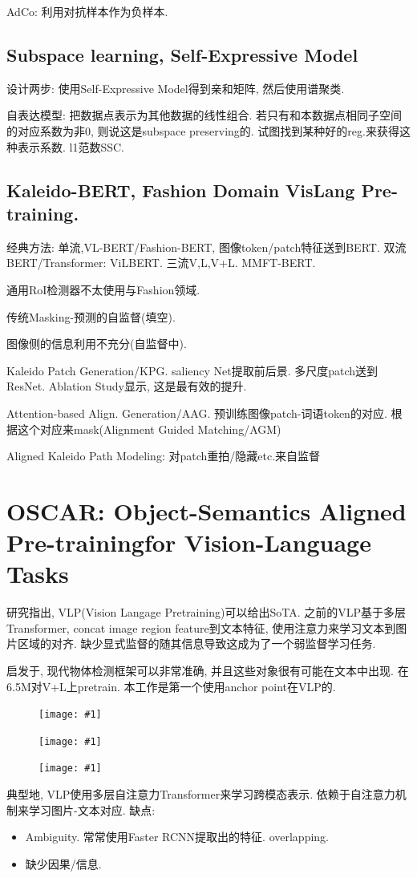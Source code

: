 \documentclass{article}
\newcommand{\cfig}[1]{
    \begin{figure}[htbp]
    \centering
    \texttt{[image: \#1]}
\end{figure}
}
\begin{document}
AdCo: 利用对抗样本作为负样本.

\subsection{Subspace learning, Self-Expressive Model}
设计两步: 使用Self-Expressive Model得到亲和矩阵, 然后使用谱聚类.

自表达模型: 把数据点表示为其他数据的线性组合.
若只有和本数据点相同子空间的对应系数为非0, 则说这是subspace preserving的.
试图找到某种好的reg.来获得这种表示系数. l1范数SSC.

\subsection{Kaleido-BERT, Fashion Domain VisLang Pre-training.} 

经典方法: 单流,VL-BERT/Fashion-BERT, 图像token/patch特征送到BERT.
双流BERT/Transformer: ViLBERT.
三流V,L,V+L. MMFT-BERT.

通用RoI检测器不太使用与Fashion领域.

传统Masking-预测的自监督(填空).

图像侧的信息利用不充分(自监督中).

Kaleido Patch Generation/KPG. saliency Net提取前后景. 多尺度patch送到ResNet. Ablation Study显示, 这是最有效的提升.

Attention-based Align. Generation/AAG. 预训练图像patch-词语token的对应. 根据这个对应来mask(Alignment Guided Matching/AGM)

Aligned Kaleido Path Modeling: 对patch重拍/隐藏etc.来自监督


\section{OSCAR: Object-Semantics Aligned Pre-trainingfor Vision-Language Tasks}

研究指出, VLP(Vision Langage Pretraining)可以给出SoTA. 之前的VLP基于多层Transformer, concat image region feature到文本特征, 使用注意力来学习文本到图片区域的对齐. 缺少显式监督的随其信息导致这成为了一个弱监督学习任务.

启发于, 现代物体检测框架可以非常准确, 并且这些对象很有可能在文本中出现. 在6.5M对V+L上pretrain. 本工作是第一个使用anchor point在VLP的.

\cfig{OSCAR-pipeline.png}

\cfig{OSCAR-arch.png}

\cfig{OSCAR-net.png}

典型地, VLP使用多层自注意力Transformer来学习跨模态表示. 依赖于自注意力机制来学习图片-文本对应. 缺点:
\begin{itemize}
    \item Ambiguity. 常常使用Faster RCNN提取出的特征. overlapping.
    \item 缺少因果/信息.
\end{itemize}
\end{document}
